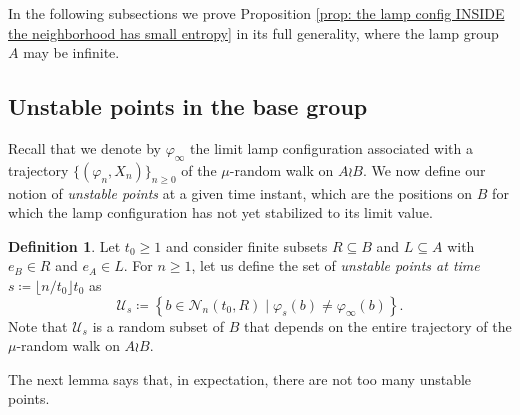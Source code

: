 \documentclass[reqno,oneside,11pt]{amsart}
\theoremstyle{plain}
\theoremstyle{definition}
\newtheorem{defn}[thm]{Definition} %
\begin{document}
In the following subsections we prove Proposition \ref{prop: the lamp config INSIDE the neighborhood has small entropy} in its full generality, where the lamp group $A$ may be infinite.
\subsection{Unstable points in the base group}\label{subsection: unstable points in the base group}

Recall that we denote by $\varphi_{\infty}$ the limit lamp configuration associated with a trajectory $\{(\varphi_n,X_n)\}_{n\ge 0}$ of the $\mu$-random walk on $A\wr B$. We now define our notion of \emph{unstable points} at a given time instant, which are the positions on $B$ for which the lamp configuration has not yet stabilized to its limit value.

\begin{defn}\label{def: unstable elements} Let $t_0\ge 1$ and consider finite subsets $R\subseteq B$ and $L\subseteq A$ with $e_B\in R$ and $e_A\in L$. For $n\ge 1$, let us define the set of \emph{unstable points at time $s\coloneqq\lfloor n/t_0\rfloor t_0$} as
	\begin{equation*}
		\mathcal{U}_s\coloneqq \left \{b\in \mathcal{N}_n(t_0,R)\mid \varphi_s(b)\neq\varphi_{\infty}(b) \right \}.
	\end{equation*}
	Note that $\mathcal{U}_s$ is a random subset of $B$ that depends on the entire trajectory of the $\mu$-random walk on $A\wr B$.
\end{defn}

The next lemma says that, in expectation, there are not too many unstable points.
\end{document}

